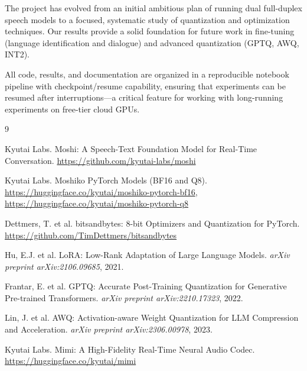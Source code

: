 \documentclass[12pt,a4paper]{report}
\begin{document}
The project has evolved from an initial ambitious plan of running dual full-duplex speech models to a focused, systematic study of quantization and optimization techniques. Our results provide a solid foundation for future work in fine-tuning (language identification and dialogue) and advanced quantization (GPTQ, AWQ, INT2).

All code, results, and documentation are organized in a reproducible notebook pipeline with checkpoint/resume capability, ensuring that experiments can be resumed after interruptions---a critical feature for working with long-running experiments on free-tier cloud GPUs.

\begin{thebibliography}{9}

Kyutai Labs.
\newblock Moshi: A Speech-Text Foundation Model for Real-Time Conversation.
\newblock \url{https://github.com/kyutai-labs/moshi}

Kyutai Labs.
\newblock Moshiko PyTorch Models (BF16 and Q8).
\newblock \url{https://huggingface.co/kyutai/moshiko-pytorch-bf16}, \url{https://huggingface.co/kyutai/moshiko-pytorch-q8}

Dettmers, T. et al.
\newblock bitsandbytes: 8-bit Optimizers and Quantization for PyTorch.
\newblock \url{https://github.com/TimDettmers/bitsandbytes}

Hu, E.J. et al.
\newblock LoRA: Low-Rank Adaptation of Large Language Models.
\newblock \textit{arXiv preprint arXiv:2106.09685}, 2021.

Frantar, E. et al.
\newblock GPTQ: Accurate Post-Training Quantization for Generative Pre-trained Transformers.
\newblock \textit{arXiv preprint arXiv:2210.17323}, 2022.

Lin, J. et al.
\newblock AWQ: Activation-aware Weight Quantization for LLM Compression and Acceleration.
\newblock \textit{arXiv preprint arXiv:2306.00978}, 2023.

Kyutai Labs.
\newblock Mimi: A High-Fidelity Real-Time Neural Audio Codec.
\newblock \url{https://huggingface.co/kyutai/mimi}

\end{thebibliography}
\end{document}
